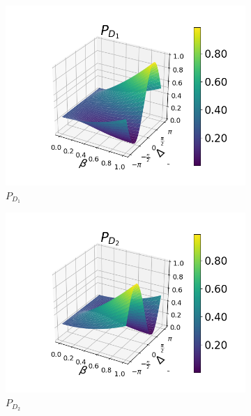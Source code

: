 \documentclass[12pt]{book}
\begin{document}
\begin{figure}[t!]
\centering
\begin{subfigure}[b]{0.40\linewidth}
\includegraphics[width=\linewidth]{images/pd1_2.png}
\caption{$P_{D_{1}}$}
\end{subfigure}
\begin{subfigure}[b]{0.40\linewidth}
\includegraphics[width=\linewidth]{images/pd2_2.png}
\caption{$P_{D_{2}}$ }
\label{fig:BS1}
\end{subfigure}
\begin{subfigure}[b]{0.40\linewidth}

\end{subfigure}
\end{figure}
\end{document}
